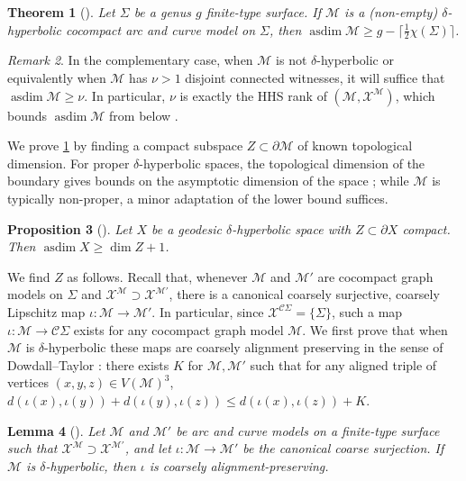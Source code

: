\documentclass[twoside]{amsart}
\theoremstyle{plain}
\newtheorem{theorem}{Theorem}[section]
\newtheorem{lemma}[theorem]{Lemma}
\newtheorem{proposition}[theorem]{Proposition}
\theoremstyle{break}
\theoremstyle{definition}
\theoremstyle{remark}
\newtheorem{remark*}[theorem]{Remark}
\DeclareMathOperator{\asdim}{asdim}
\newcommand{\cc}{\mathcal C}
\newcommand{\M}{\mathcal M}
\newcommand{\X}{\mathscr X}
\begin{document}
\begin{theorem}[{\cite[Thm.~4.21]{ga_asdim}}]\label{thm:cm_hyp}
  Let $\Sigma$ be a genus $g$ finite-type surface.
  If $\M$ is a (non-empty) $\delta$-hyperbolic cocompact
   arc and curve model on $\Sigma$, then $\asdim \M \geq g -
  \lceil \frac 12 \chi(\Sigma) \rceil$. 
\end{theorem}

\begin{remark*}\label{rmk:flats}
  In the complementary case, when $\M$ is not $\delta$-hyperbolic or
equivalently when $\M$ has $\nu > 1$ disjoint connected
witnesses, it will suffice  that $\asdim \M \geq \nu$.  In
particular, $\nu$ is exactly the HHS rank of $(\M,\X^\M)$, which
bounds $\asdim \M$ from below \cite[Thm.~1.15]{quasiflats}.
\end{remark*}

We prove \cref{thm:cm_hyp} by finding a compact subspace $Z \subset
\partial \M$ of known topological dimension.  For proper
$\delta$-hyperbolic spaces, the topological dimension of the
boundary gives bounds on the asymptotic dimension of the space
\cite[Prop.~6.2]{bleb}; while $\M$ is typically non-proper, a minor adaptation of
the lower bound suffices. 

\begin{proposition}[{\cite[Prop.~2.5]{ga_asdim}}]\label{prop:bdry_cpt}
  Let $X$ be a geodesic $\delta$-hyperbolic space with $Z \subset
  \partial X$ compact.  Then $\asdim X \geq \dim Z + 1$.
\end{proposition}

We find $Z$ as follows.  Recall that, whenever $\M$ and $\M'$ are cocompact
graph models on $\Sigma$ and $\X^{\M} \supset
\X^{\M'}$, there is a canonical coarsely surjective, coarsely
Lipschitz map $\iota : \M \to \M'$.  In particular, since $\X^{\cc
\Sigma} = \{\Sigma\}$, such a map $\iota : \M \to \cc \Sigma$ 
exists for any cocompact graph model $\M$.  We first prove that
when $\M$ is $\delta$-hyperbolic 
these maps are coarsely alignment preserving in the sense
of Dowdall--Taylor \cite{align}:  there exists $K$ for $\M,\M'$ such that 
for any aligned triple of vertices $(x,y,z) \in
V(\M)^3$, $d(\iota(x),\iota(y)) + d(\iota(y),\iota(z)) \leq
d(\iota(x),\iota(z)) + K$.

\begin{lemma}[{\cite[Lem.~4.22]{ga_asdim}}]\label{lem:canon_align}
  Let $\M$ and $\M'$ be arc and curve models on a finite-type surface
  such that $\X^\M \supset \X^{\M'}$, and let $\iota : \M
  \to \M'$ be the canonical coarse surjection.  If $\M$ is
  $\delta$-hyperbolic, then $\iota$ is
  coarsely alignment-preserving.
\end{lemma}
\end{document}
